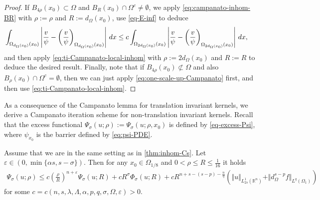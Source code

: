 \documentclass[11pt,reqno]{amsart}
\theoremstyle{plain}
\theoremstyle{definition}
\numberwithin{equation}{section}
\newcommand{\R}{\mathbb{R}}
\newcommand{\1}{\mathbbm{1}}
\renewcommand{\d}{\textnormal{\,d}}
\begin{document}
\begin{proof}
If $B_{4\rho}(x_0) \subset \Omega$ and $B_R(x_0) \cap \Omega^c \not=\emptyset$, we apply \eqref{eq:campanato-inhom-BR} with $\rho := \rho$ and $R := d_{\Omega}(x_0)$, use \eqref{eq-E-inf} to deduce
\begin{align}
\label{eq:one-scale-up-Campanato}
& \int_{\Omega_{d_{\Omega}(x_0)}(x_0)} \left|\frac{v}{\psi} - \left( \frac{v}{\psi} \right)_{\Omega_{d_{\Omega}(x_0)}(x_0)} \right| \d x \le c \int_{\Omega_{2d_{\Omega}(x_0)}(x_0)} \left|\frac{v}{\psi}  - \left( \frac{v}{\psi} \right)_{\Omega_{2d_{\Omega}(x_0)}(x_0)}\right| \d x,
\end{align}
and then apply \eqref{eq:ti-Campanato-local-inhom} with $\rho := 2 d_{\Omega}(x_0)$ and $R := R$ to deduce the desired result. Finally, note that if $B_{4\rho}(x_0) \not\subset \Omega$ and also $B_{\rho}(x_0) \cap \Omega^c = \emptyset$, then we can just apply \eqref{eq:one-scale-up-Campanato} first, and then use \eqref{eq:ti-Campanato-local-inhom}.
\end{proof}





As a consequence of the Campanato lemma for translation invariant kernels, we derive a Campanato iteration scheme for non-translation invariant kernels. Recall that the excess functional $\Psi_\sigma(u; \rho):=\Psi_\sigma(u; \rho, x_0)$ is defined by \eqref{eq-excess-Psi}, where $\psi_{x_0}$ is the barrier defined by \eqref{eq:psi-PDE}.

\begin{lemma}\label{lem-u-Holder-inhom}
Assume that we are in the same setting as in \autoref{thm:inhom-Cs}. Let $\varepsilon \in (0, \min\{\alpha s, s-\sigma\})$. Then for any $x_0 \in \Omega_{1/8}$ and $0<\rho\leq R \le \frac{1}{16}$ it holds
\begin{align*}
\Psi_{\sigma}(u; \rho) \leq c \left( \frac{\rho}{R} \right)^{n+\varepsilon} \Psi_{\sigma}(u; R) + cR^\sigma \Phi_{\sigma}(u; R) + c R^{n + s -(s-p)-\frac{n}{q}} \left( \Vert u \Vert_{L^1_{2s}(\R^n)} + \Vert d_{\Omega}^{s-p} f \Vert_{L^q(\Omega_{1})} \right)
\end{align*}
for some $c=c(n, s, \lambda, \Lambda, \alpha, p, q, \sigma, \Omega, \varepsilon) > 0$.
\end{lemma}
\end{document}

